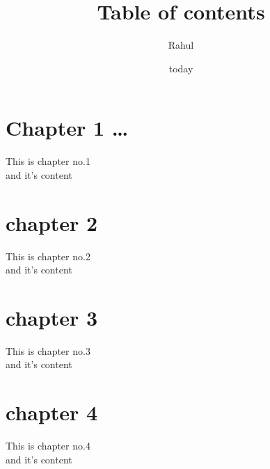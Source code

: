 \documentclass[a4paper,12pt]{article}
\title{Table of contents}
\author{Rahul}
\date{today}
\begin{document}
\maketitle
    \tableofcontents
\newpage
    \section{Chapter 1   \dots}
    This is chapter no.1\\
    and it's content
\newpage
    \section{chapter 2}
    This is chapter no.2\\
    and it's content
\newpage
    \section{chapter 3}
    This is chapter no.3\\
    and it's content
\newpage
    \section{chapter 4}
    This is chapter no.4\\
    and it's content
\newpage

    \newpage
\end{document}
